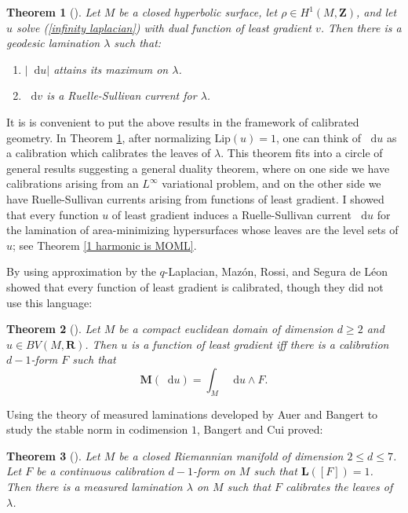\documentclass[reqno,11pt]{amsart}
\newcommand{\ZZ}{\mathbf{Z}}
\newcommand{\RR}{\mathbf{R}}
\newcommand*\dif{\mathop{}\!\mathrm{d}}
\newcommand{\Lip}{\mathrm{Lip}}
\newcommand{\Mass}{\mathbf M}
\newcommand{\Comass}{\mathbf L}
\newtheorem{theorem}{Theorem}[section]
\theoremstyle{definition}
\numberwithin{equation}{section}
\begin{document}
\begin{theorem}[{\cite{daskalopoulos2020transverse}}]\label{Daskalopolous MFMC}
Let $M$ be a closed hyperbolic surface, let $\rho \in H^1(M, \ZZ)$, and let $u$ solve (\ref{infinity laplacian}) with dual function of least gradient $v$.
Then there is a geodesic lamination $\lambda$ such that:
\begin{enumerate}
\item $|\dif u|$ attains its maximum on $\lambda$.
\item $\dif v$ is a Ruelle-Sullivan current for $\lambda$.
\end{enumerate}
\end{theorem}

It is is convenient to put the above results in the framework of calibrated geometry.
In Theorem \ref{Daskalopolous MFMC}, after normalizing $\Lip(u) = 1$, one can think of $\dif u$ as a calibration which calibrates the leaves of $\lambda$.
This theorem fits into a circle of general results suggesting a general duality theorem, where on one side we have calibrations arising from an $L^\infty$ variational problem, and on the other side we have Ruelle-Sullivan currents arising from functions of least gradient.
I showed that every function $u$ of least gradient induces a Ruelle-Sullivan current $\dif u$ for the lamination of area-minimizing hypersurfaces whose leaves are the level sets of $u$; see Theorem \ref{1 harmonic is MOML}.

By using approximation by the $q$-Laplacian, Maz\'on, Rossi, and Segura de L\'eon showed that every function of least gradient is calibrated, though they did not use this language:

\begin{theorem}[{\cite{Mazon14}}]\label{Mazon MFMC}
Let $M$ be a compact euclidean domain of dimension $d \geq 2$ and $u \in BV(M, \RR)$.
Then $u$ is a function of least gradient iff there is a calibration $d - 1$-form $F$ such that 
$$\Mass(\dif u) = \int_M \dif u \wedge F.$$
\end{theorem}

Using the theory of measured laminations developed by Auer and Bangert \cite{Auer01} to study the stable norm in codimension $1$, Bangert and Cui proved:

\begin{theorem}[{\cite{bangert_cui_2017}}]\label{Bangert MFMC}
Let $M$ be a closed Riemannian manifold of dimension $2 \leq d \leq 7$.
Let $F$ be a continuous calibration $d - 1$-form on $M$ such that $\Comass([F]) = 1$.
Then there is a measured lamination $\lambda$ on $M$ such that $F$ calibrates the leaves of $\lambda$.
\end{theorem}
\end{document}
